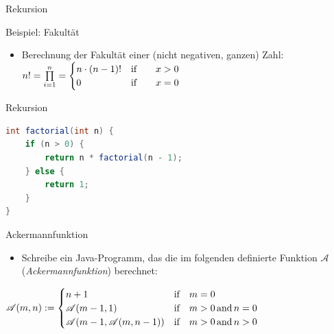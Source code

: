 \documentclass[18pt]{beamer}
\begin{document}
\begin{frame}{Rekursion}
    \begin{exampleblock}{Beispiel: Fakultät}
        \begin{itemize}
            \item Berechnung der Fakultät einer (nicht negativen, ganzen) Zahl:\\
            \vspace{.2in}
            $
            n! = \prod\limits_{i=1}^{n} =
                \begin{cases}
                    n \cdot (n-1)! & \text{if\qquad} x > 0 \\
                    0 & \text{if\qquad} x = 0
                \end{cases}
            $
        \end{itemize}
    \end{exampleblock}
\end{frame}

\begin{frame}[fragile]{Rekursion}
    \begin{exampleblock}{}
        \begin{lstlisting}[language=Java,basicstyle=\scriptsize]
int factorial(int n) {
    if (n > 0) {
        return n * factorial(n - 1);
    } else {
        return 1;
    }
}
        \end{lstlisting}

    \end{exampleblock}

\end{frame}

\begin{frame}[fragile]{Ackermannfunktion}
    \begin{itemize}
        \item Schreibe ein Java-Programm, das die im folgenden definierte Funktion $\mathscr{A}$ (\textit{Ackermannfunktion}) berechnet:
    \end{itemize}
    \begin{exampleblock}{}
        $
        \mathscr{A}(m, n) :=
        \begin{cases}
            n+1 & \text{if\quad} m = 0\\
            \mathscr{A}(m-1, 1) & \text{if\quad} m > 0 \text{\,and\,} n = 0\\
            \mathscr{A}(m-1, \mathscr{A}(m, n-1)) & \text{if\quad} m > 0 \text{\,and\,} n > 0
        \end{cases}
        $
    \end{exampleblock}

\end{frame}
\end{document}
